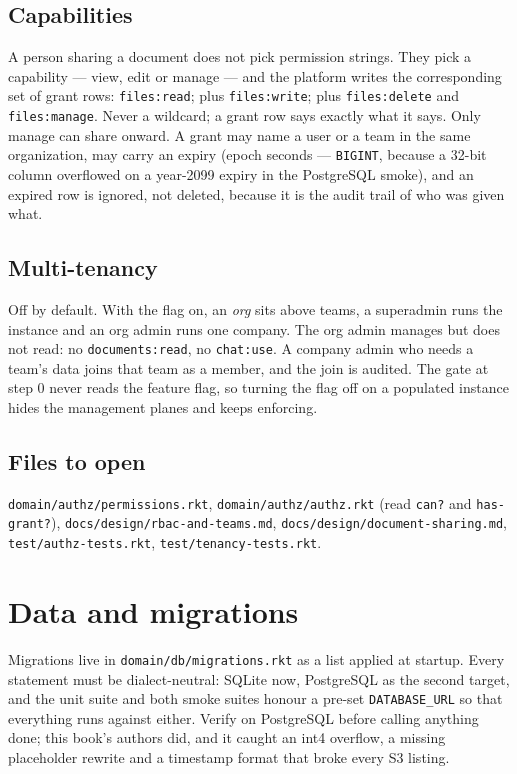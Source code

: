 \documentclass[11pt,a4paper]{report}
\gdef\currentchapterart{art/telemachus-head.png}
\newcommand{\chapterart}[1]{\gdef\currentchapterart{#1}}
\newcommand{\chapterart}[1]{}
\begin{document}
\section{Capabilities}

A person sharing a document does not pick permission strings. They pick a capability --- view, edit or manage --- and the platform writes the corresponding set of grant rows: \texttt{files:read}; plus \texttt{files:write}; plus \texttt{files:delete} and \texttt{files:manage}. Never a wildcard; a grant row says exactly what it says. Only manage can share onward. A grant may name a user or a team in the same organization, may carry an expiry (epoch seconds --- \texttt{BIGINT}, because a 32-bit column overflowed on a year-2099 expiry in the PostgreSQL smoke), and an expired row is ignored, not deleted, because it is the audit trail of who was given what.

\section{Multi-tenancy}

Off by default. With the flag on, an \emph{org} sits above teams, a superadmin runs the instance and an org admin runs one company. The org admin manages but does not read: no \texttt{documents:read}, no \texttt{chat:use}. A company admin who needs a team's data joins that team as a member, and the join is audited. The gate at step 0 never reads the feature flag, so turning the flag off on a populated instance hides the management planes and keeps enforcing.

\section{Files to open}

\texttt{domain/authz/permissions.rkt}, \texttt{domain/authz/authz.rkt} (read \texttt{can?} and \texttt{has-grant?}), \texttt{docs/design/rbac-and-teams.md}, \texttt{docs/design/document-sharing.md}, \texttt{test/authz-tests.rkt}, \texttt{test/tenancy-tests.rkt}.

\chapterart{art/ch-05-data.png}
\chapter{Data and migrations}

Migrations live in \texttt{domain/db/migrations.rkt} as a list applied at startup. Every statement must be dialect-neutral: SQLite now, PostgreSQL as the second target, and the unit suite and both smoke suites honour a pre-set \texttt{DATABASE\_URL} so that everything runs against either. Verify on PostgreSQL before calling anything done; this book's authors did, and it caught an int4 overflow, a missing placeholder rewrite and a timestamp format that broke every S3 listing.
\end{document}
